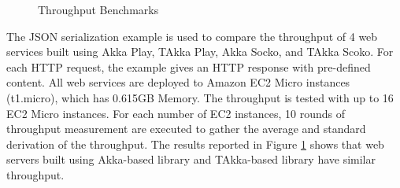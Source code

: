 \begin{figure}[p]
     \begin{center}
    \end{center}
     \caption{Throughput Benchmarks}
   \label{throughput}
\end{figure}

The JSON serialization example \cite{techempower} is used to compare the 
throughput of 4 web services built using Akka Play, TAkka Play, Akka 
Socko, and TAkka Scoko.  For each HTTP request, the example gives an 
HTTP response with pre-defined content.  All web services are deployed to 
Amazon EC2 Micro instances (t1.micro), which has 0.615GB Memory. The throughput 
is tested with up to 16 EC2 Micro instances.  For each number of EC2 instances, 
10 rounds of throughput measurement are executed to gather the average and 
standard derivation of the throughput. The results reported in Figure 
\ref{throughput} shows that web servers built using Akka-based library and 
TAkka-based library have similar throughput.

